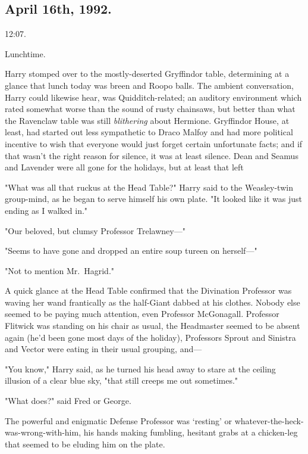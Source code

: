 
\subsection{April 16th, 1992.}

12:07\PM.

Lunchtime.

Harry stomped over to the mostly-deserted Gryffindor table, determining at a
glance that lunch today was breen and Roopo balls. The ambient conversation,
Harry could likewise hear, was Quidditch-related; an auditory environment which
rated somewhat worse than the sound of rusty chainsaws, but better than what
the Ravenclaw table was still \emph{blithering} about Hermione. Gryffindor
House, at least, had started out less sympathetic to Draco Malfoy and had more
political incentive to wish that everyone would just forget certain unfortunate
facts; and if that wasn't the right reason for silence, it was at least
silence. Dean and Seamus and Lavender were all gone for the holidays, but at
least that left{\el}

"What was all that ruckus at the Head Table?" Harry said to the Weasley-twin
group-mind, as he began to serve himself his own plate. "It looked like it was
just ending as I walked in."

"Our beloved, but clumsy Professor Trelawney—"

"Seems to have gone and dropped an entire soup tureen on herself—"

"Not to mention Mr.~Hagrid."

A quick glance at the Head Table confirmed that the Divination Professor was
waving her wand frantically as the half-Giant dabbed at his clothes. Nobody
else seemed to be paying much attention, even Professor McGonagall. Professor
Flitwick was standing on his chair as usual, the Headmaster seemed to be absent
again (he'd been gone most days of the holiday), Professors Sprout and Sinistra
and Vector were eating in their usual grouping, and—

"You know," Harry said, as he turned his head away to stare at the ceiling
illusion of a clear blue sky, "that still creeps me out sometimes."

"What does?" said Fred or George.

The powerful and enigmatic Defense Professor was `resting' or
whatever-the-heck-was-wrong-with-him, his hands making fumbling, hesitant grabs
at a chicken-leg that seemed to be eluding him on the plate.

